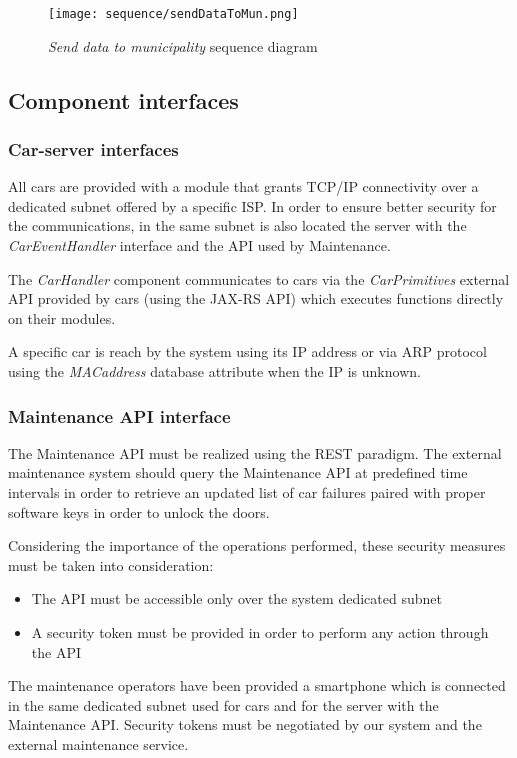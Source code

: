 \begin{figure}[h!]
	\centering
	\texttt{[image: sequence/sendDataToMun.png]}
	\caption{
		\label{fig:sendDataToMun} 
		\emph{Send data to municipality} sequence diagram
	}
\end{figure}
\clearpage


\subsection{Component interfaces}

\subsubsection{Car-server interfaces}
\label{sec:carServerInt}
All cars are provided with a module that grants TCP/IP connectivity over a dedicated subnet offered by a specific ISP. In order to ensure better security for the communications, in the same subnet is also located the server with the \mbox{\emph{CarEventHandler}} interface and the API used by Maintenance.

The \emph{CarHandler} component communicates to cars via the \mbox{\emph{CarPrimitives}} external API provided by cars (using the JAX-RS API) which executes functions directly on their modules.

A specific car is reach by the system using its IP address or via ARP protocol using the \emph{MACaddress} database attribute when the IP is unknown.

\subsubsection{Maintenance API interface}
The Maintenance API must be realized using the REST paradigm. The external maintenance system should query the Maintenance API at predefined time intervals in order to retrieve an updated list of car failures paired with proper software keys in order to unlock the doors.

Considering the importance of the operations performed, these security measures must be taken into consideration:
\begin{itemize}
	\item The API must be accessible only over the system dedicated subnet
	\item A security token must be provided in order to perform any action through the API
\end{itemize}
The maintenance operators have been provided a smartphone which is connected in the same dedicated subnet used for cars and for the server with the Maintenance API.
Security tokens must be negotiated by our system and the external maintenance service.

